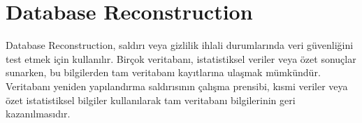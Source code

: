 \section{Database Reconstruction}

Database Reconstruction, saldırı veya gizlilik ihlali durumlarında veri güvenliğini test etmek için kullanılır. Birçok veritabanı, istatistiksel veriler veya özet sonuçlar sunarken, bu bilgilerden tam veritabanı kayıtlarına ulaşmak mümkündür. Veritabanı yeniden yapılandırma saldırısının çalışma prensibi, kısmi veriler veya özet istatistiksel bilgiler kullanılarak tam veritabanı bilgilerinin geri kazanılmasıdır. 

\newpage